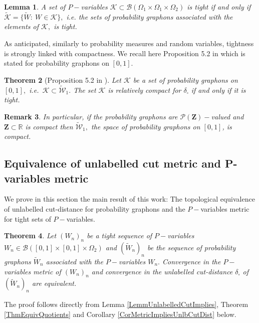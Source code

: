 \documentclass[11pt]{article}
\newtheorem{theorem}{Theorem}[section]
\newtheorem{lemma}[theorem]{Lemma}
\newtheorem{remark}[theorem]{Remark}
\def\R{\mathbb{R}}
\newcommand{\cB}{{\mathcal B}}  %
\newcommand{\cK}{{\mathcal K}}  %
\newcommand{\cP}{{\mathcal P}}  %
\newcommand{\Space}{\mathbf{Z}}
\newcommand{\UGraphon}{\widetilde{\mathcal{W}}_1}
\begin{document}
\begin{lemma}\label{LemmEqTightness}
 A set of $P-$variables $\cK\subset \cB(\Omega_1\times\Omega_1\times \Omega_2)$ is \emph{tight} if and only if $\widetilde \cK=\{\widetilde W: \ W\in \cK\},$ i.e. the sets of probability graphons associated with the elements of $\cK,$ is tight. 
\end{lemma}

As anticipated, similarly to probability measures and random variables, tightness is strongly linked with compactness. We recall here Proposition 5.2 in \cite{abraham2023probabilitygraphons} which is stated for probability graphons on $[0,1].$

\begin{theorem}[Proposition 5.2 in \cite{abraham2023probabilitygraphons}]\label{ThmRelCompact}
Let $\cK$ be a set of probability graphons on $[0,1],$ i.e.\ $\cK\subset \UGraphon.$ The set $\cK$ is relatively compact for $\delta_{\square}$  if and only if it is tight.
\end{theorem}
\begin{remark}
In particular, if the probability graphons are $\cP(\Space)-$valued and $\Space\subset \R$ is compact then $\UGraphon,$ the space of probability graphons on $[0,1]$, is compact. 
\end{remark}

\subsection{Equivalence of unlabelled cut metric and P-variables metric}

We prove in this section the main result of this work: The topological equivalence of unlabelled cut-distance for probability graphons and the $P-$variables metric for tight sets of $P-$variables.

\begin{theorem}\label{TH:equivalence_dM_cut_dist}
Let $(W_n)_n$ be a tight sequence of $P-$variables $W_n\in \cB([0,1]\times [0,1]\times \Omega_2) $ and $(\widetilde W_n)_n$ be the sequence of probability graphons $\widetilde W_n$ associated with the $P-$variables $W_n.$ Convergence in the $P-$variables metric of $(W_n)_n$ and convergence in the unlabelled cut-distance $\delta_{\square}$ of $(\widetilde W_n)_n$ are equivalent.    
\end{theorem}

The proof follows directly from Lemma \ref{LemmUnlabelledCutImplies}, Theorem \ref{ThmEquivQuotients} and Corollary \ref{CorMetricImpliesUnlbCutDist} below.
\end{document}
